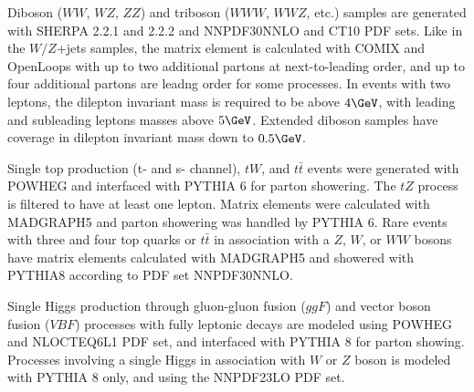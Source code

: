 Diboson ($WW$, $WZ$, $ZZ$) and triboson ($WWW$, $WWZ$, etc.) samples are generated with SHERPA 2.2.1 and 2.2.2 and NNPDF30NNLO and CT10 PDF sets.  Like in the $W/Z$+jets samples, the matrix element is calculated with COMIX and OpenLoops with up to two additional partons at next-to-leading order, and up to four additional partons are leadng order for some processes.  In events with two leptons, the dilepton invariant mass is required to be above $4\GeV$, with leading and subleading leptons masses above $5\GeV$.  Extended diboson samples have coverage in dilepton invariant mass down to $0.5\GeV$.    
 
 Single top production (t- and s- channel), $tW$, and $t\bar{t}$ events were generated with POWHEG and interfaced with PYTHIA 6 for parton showering.  The $tZ$ process is filtered to have at least one lepton.  Matrix elements were calculated with MADGRAPH5 and parton showering was handled by PYTHIA 6.  Rare events with three and four top quarks or $t\bar{t}$ in association with a $Z$, $W$, or $WW$ bosons have matrix elements calculated with MADGRAPH5 and showered with PYTHIA8 according to PDF set NNPDF30NNLO.
 
Single Higgs production through gluon-gluon fusion ($ggF$) and vector boson fusion ($VBF$) processes with fully leptonic decays are modeled using POWHEG and NLOCTEQ6L1 PDF set, and interfaced with PYTHIA 8 for parton showing.  Processes involving a single Higgs in association with $W$ or $Z$ boson is modeled with PYTHIA 8 only, and using the NNPDF23LO PDF set.
 
 \iffalse
 \section{Derivation}
Describe details of the SUSY16 derivation used to select events from data

\fi 

 

